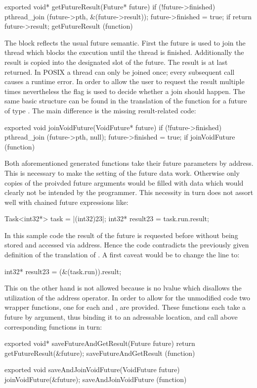 \begin{ccode}
exported void* getFutureResult(Future* future) { 
  if (!future->finished) { 
    pthread_join (future->pth, &(future->result)); 
    future->finished = true; 
  } if 
  return future->result; 
} getFutureResult (function)
\end{ccode}
The  block reflects the usual future semantic. First the future is used to join the thread which blocks the execution until the thread is finished. Additionally the result is copied into the designated slot of the future. The result is at last returned. In POSIX a thread can only be joined once; every subsequent call causes a runtime error. In order to allow the user to request the result multiple times nevertheless the  flag is used to decide whether a join should happen. The same basic structure can be found in the translation of the  function for a future of type . The main difference is the missing result-related code:
\begin{ccode}
exported void joinVoidFuture(VoidFuture* future) { 
  if (!future->finished) { 
    pthread_join (future->pth, null); 
    future->finished = true; 
  } if 
} joinVoidFuture (function)
\end{ccode}
Both aforementioned generated functions take their future parameters by address. This is necessary to make the setting of the future data work. Otherwise only copies of the proivded future arguments would be filled with data which would clearly not be intended by the programmer. This necessity in turn does not assort well with chained future expressions like:

\begin{ccode}
Task<int32*> task = |(int32)23|;
int32* result23 = task.run.result;
\end{ccode}

In this sample code the result of the future is requested before without being stored and accessed via address. Hence the code contradicts the previously given definition of the translation of . A first caveat would be to change the line to:

\begin{ccode}
int32* result23 = (&(task.run)).result;
\end{ccode}

This on the other hand is not allowed because  is no lvalue\cite[pp.~147-148]{CPrimerPlus} which disallows the utilization of the address operator. In order to allow for the unmodified code two wrapper functions, one for each  and , are provided. These functions each take a future by argument, thus binding it to an adressable location, and call above corresponding functions in turn:
\begin{ccode}
exported void* saveFutureAndGetResult(Future future) { 
  return getFutureResult(&future); 
} saveFutureAndGetResult (function)

exported void saveAndJoinVoidFuture(VoidFuture future) { 
  joinVoidFuture(&future); 
} saveAndJoinVoidFuture (function)
\end{ccode}

